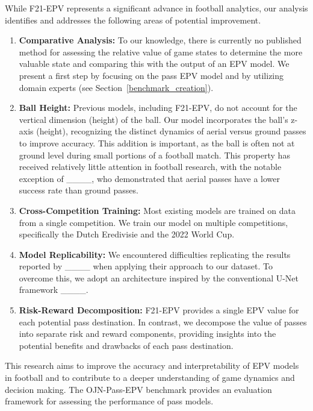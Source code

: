 


While F21-EPV represents a significant advance in football analytics, our analysis identifies and addresses the following areas of potential improvement.

\begin{enumerate}
    \item \textbf{Comparative Analysis:} 
        To our knowledge, there is currently no published method for assessing the relative value of game states to determine the more valuable state and comparing this with the output of an EPV model. We present a first step by focusing on the pass EPV model and by utilizing domain experts (see Section~\ref{benchmark_creation}).
    \item \textbf{Ball Height:}
        Previous models, including F21-EPV, do not account for the vertical dimension (height) of the ball. Our model incorporates the ball's z-axis (height), recognizing the distinct dynamics of aerial versus ground passes to improve accuracy. This addition is important, as the ball is often not at ground level during small portions of a football match. This property has received relatively little attention in football research, with the notable exception of ____, who demonstrated that aerial passes have a lower success rate than ground passes.

    \item \textbf{Cross-Competition Training:}
        Most existing models are trained on data from a single competition. We train our model on multiple competitions, specifically the Dutch Eredivisie and the 2022 World Cup.
    
    \item \textbf{Model Replicability:}  
        We encountered difficulties replicating the results reported by ____ when applying their approach to our dataset. To overcome this, we adopt an architecture inspired by the conventional U-Net framework ____. 

    \item \textbf{Risk-Reward Decomposition:}
        F21-EPV provides a single EPV value for each potential pass destination. In contrast, we decompose the value of passes into separate risk and reward components, providing insights into the potential benefits and drawbacks of each pass destination.
\end{enumerate}

This research aims to improve the accuracy and interpretability of EPV models in football and to contribute to a deeper understanding of game dynamics and decision making. The OJN-Pass-EPV benchmark provides an evaluation framework for assessing the performance of pass models.